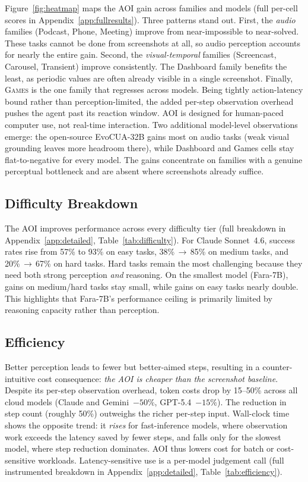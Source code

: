 \documentclass[11pt]{article}
\begin{document}


Figure~\ref{fig:heatmap} maps the AOI gain across families and models (full
per-cell scores in Appendix~\ref{app:fullresults}).
Three patterns stand out.
First, the \emph{audio} families (Podcast, Phone, Meeting) improve from near-impossible to
near-solved. These tasks cannot be done from screenshots at all, so audio
perception accounts for nearly the entire gain.
Second, the \emph{visual-temporal} families (Screencast, Carousel, Transient) improve
consistently. The Dashboard family benefits the least, as periodic values are often already visible in a single screenshot.
Finally, \textsc{Games} is the one family that regresses across models. Being tightly action-latency bound rather than perception-limited, the added per-step observation overhead pushes the agent past its reaction window. AOI is designed for human-paced computer use, not real-time interaction.
Two additional model-level observations emerge: the open-source EvoCUA-32B gains most on audio tasks
(weak visual grounding leaves more headroom there), while Dashboard
and Games cells stay flat-to-negative for every model. The gains concentrate on families with a genuine perceptual bottleneck and are absent where screenshots already suffice.

\subsection{Difficulty Breakdown}

The AOI improves performance across every difficulty tier (full breakdown in
Appendix~\ref{app:detailed}, Table~\ref{tab:difficulty}). For Claude Sonnet~4.6, success rates rise from 57\% to 93\% on easy tasks, 38\%\,$\to$\,85\% on medium tasks, and 20\%\,$\to$\,67\% on hard tasks.
Hard tasks remain the most challenging because they need both strong perception \emph{and} reasoning. 
On the smallest model (Fara-7B), gains on medium/hard tasks stay small, while gains on easy tasks nearly double. This highlights that Fara-7B's performance ceiling is primarily limited by reasoning capacity rather than perception.

\subsection{Efficiency}

Better perception leads to fewer but better-aimed steps, resulting in a counter-intuitive
cost consequence: \emph{the AOI is cheaper than the screenshot baseline}. Despite its per-step observation overhead, token costs drop by 15--50\% across all cloud models
(Claude and Gemini~$-50\%$, GPT-5.4~$-15\%$). The reduction in step count (roughly 50\%) outweighs the richer per-step input.
Wall-clock time shows the opposite trend: it \emph{rises} for fast-inference models, where observation work exceeds the latency saved by fewer steps, and falls only
for the slowest model, where step reduction dominates. AOI thus lowers cost for
batch or cost-sensitive workloads. Latency-sensitive use is a per-model judgement call
(full instrumented breakdown in Appendix~\ref{app:detailed}, Table~\ref{tab:efficiency}).
\end{document}
